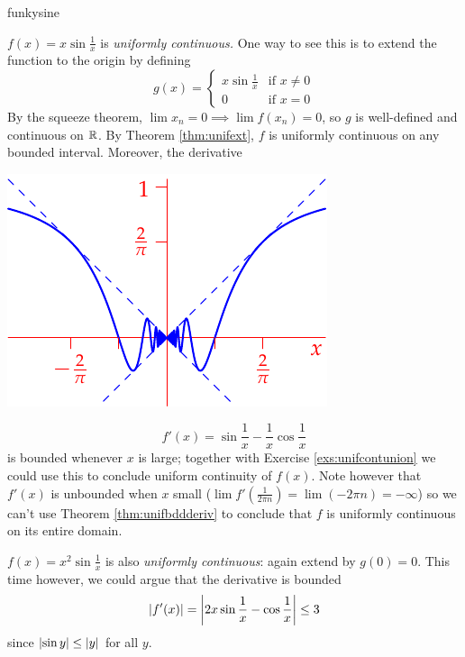 \begin{examples}{}{funkysine}
\begin{enumerate}
	
		\begin{minipage}[t]{0.6\linewidth}\vspace{0pt}
			\item $f(x)=x\sin\frac 1x$ is \emph{uniformly continuous.} One way to see this is to extend the function to the origin by defining
			\[g(x)=\begin{cases}
			x\sin \frac 1x&\text{if }x\neq 0\\
			0&\text{if }x=0
			\end{cases}\]
			By the squeeze theorem, $\lim x_n=0\implies \lim f(x_n)=0$, so $g$ is well-defined and continuous on $\mathbb{R}$. By Theorem \ref{thm:unifext}, $f$ is uniformly continuous on any bounded interval. Moreover, the derivative
		\end{minipage}
		\hfill
		\begin{minipage}[t]{0.39\linewidth}\vspace{0pt}
			\flushright\includegraphics[scale=0.98]{unifcontex2}
		\end{minipage}\par\vspace{-4pt}
		\[
			f'(x)=\sin\frac 1x-\frac 1x\cos\frac 1x
		\]
		is bounded whenever $x$ is large; together with Exercise \ref{exs:unifcontunion} we could use this to conclude uniform continuity of $f(x)$. Note however that $f'(x)$ is unbounded when $x$ small ($\lim f'\left(\frac 1{2\pi n}\right)=\lim(-2\pi n)=-\infty$)
 so we can't use Theorem \ref{thm:unifbddderiv} to conclude that $f$ is uniformly continuous on its entire domain.

		\begin{minipage}[t]{0.6\linewidth}\vspace{-5pt}
			\item\label{ex:funkysine3} $f(x)=x^2\sin\frac 1x$ is also \emph{uniformly continuous}: again extend by $g(0)=0$. This time however, we could argue that the derivative is bounded
			\[
			\left| f'(x)\right|=
				\left| 2x\sin\frac 1x-\cos\frac 1x\right|\le 3
			\]
			since $\left| \sin y\right|\le\left| y\right|$ for all $y$.\smallbreak
			

\end{minipage}
\end{enumerate}
\end{examples}
